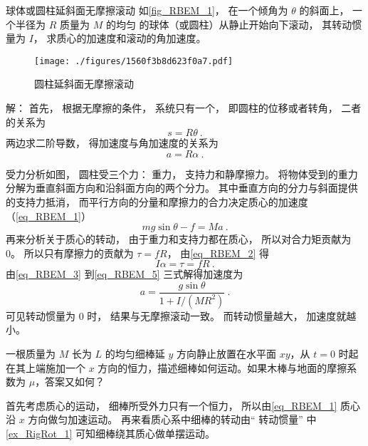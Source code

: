 \begin{example}{球体或圆柱延斜面无摩擦滚动}\label{ex_RBEM_1}
如\autoref{fig_RBEM_1}， 在一个倾角为 $\theta$ 的斜面上， 一个半径为 $R$ 质量为 $M$ 的均匀 的球体（或圆柱）从静止开始向下滚动， 其转动惯量为 $I$， 求质心的加速度和滚动的角加速度。

\begin{figure}[ht]
\centering
\texttt{[image: ./figures/1560f3b8d623f0a7.pdf]}
\caption{圆柱延斜面无摩擦滚动} \label{fig_RBEM_1}
\end{figure}

解： 首先， 根据无摩擦的条件， 系统只有一个， 即圆柱的位移或者转角， 二者的关系为
\begin{equation}
s = R\theta~.
\end{equation}
两边求二阶导数， 得加速度与角加速度的关系为
\begin{equation}\label{eq_RBEM_3}
a = R\alpha~.
\end{equation}

受力分析如图， 圆柱受三个力： 重力， 支持力和静摩擦力。 将物体受到的重力分解为垂直斜面方向和沿斜面方向的两个分力。 其中垂直方向的分力与斜面提供的支持力抵消， 而平行方向的分量和摩擦力的合力决定质心的加速度（\autoref{eq_RBEM_1}）
\begin{equation}\label{eq_RBEM_4}
mg\sin\theta - f = Ma~.
\end{equation}
再来分析关于质心的转动， 由于重力和支持力都在质心， 所以对合力矩贡献为 0。 所以只有摩擦力的贡献为 $\tau = fR$， 由\autoref{eq_RBEM_2} 得
\begin{equation}\label{eq_RBEM_5}
I\alpha = \tau = f R~.
\end{equation}
由\autoref{eq_RBEM_3} 到\autoref{eq_RBEM_5} 三式解得加速度为
\begin{equation}
a = \frac{g \sin\theta}{1 + I/(MR^2)}~.
\end{equation}
可见转动惯量为 0 时， 结果与无摩擦滚动一致。 而转动惯量越大， 加速度就越小。
\end{example}

\begin{example}{}
一根质量为 $M$ 长为 $L$ 的均匀细棒延 $y$ 方向静止放置在水平面 $xy$，从 $t=0$ 时起在其上端施加一个 $x$ 方向的恒力，描述细棒如何运动。如果木棒与地面的摩擦系数为 $\mu$，答案又如何？

首先考虑质心的运动， 细棒所受外力只有一个恒力， 所以由\autoref{eq_RBEM_1} 质心沿 $x$ 方向做匀加速运动。 再来看质心系中细棒的转动由“ 转动惯量” 中\autoref{ex_RigRot_1} 可知细棒绕其质心做单摆运动。
\end{example}
